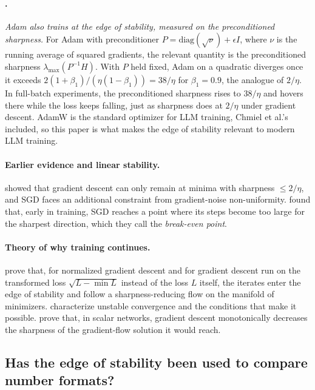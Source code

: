 \documentclass[11pt,letterpaper]{article}
\begin{document}
\paragraph{\citet{Cohen2022}.}
\emph{Adam also trains at the edge of stability, measured on the preconditioned sharpness.} For Adam with preconditioner $P=\mathrm{diag}(\sqrt{\nu})+\epsilon I$, where $\nu$ is the running average of squared gradients, the relevant quantity is the preconditioned sharpness $\lambda_{\max}(P^{-1}H)$. With $P$ held fixed, Adam on a quadratic diverges once it exceeds $2(1+\beta_1)/(\eta(1-\beta_1))=38/\eta$ for $\beta_1=0.9$, the analogue of $2/\eta$. In full-batch experiments, the preconditioned sharpness rises to $38/\eta$ and hovers there while the loss keeps falling, just as sharpness does at $2/\eta$ under gradient descent. AdamW is the standard optimizer for LLM training, Chmiel et al.'s included, so this paper is what makes the edge of stability relevant to modern LLM training.

\paragraph{Earlier evidence and linear stability.}
\citet{Wu2018} showed that gradient descent can only remain at minima with sharpness $\le2/\eta$, and SGD faces an additional constraint from gradient-noise non-uniformity. \citet{Jastrzebski2020} found that, early in training, SGD reaches a point where its steps become too large for the sharpest direction, which they call the \emph{break-even point}.

\paragraph{Theory of why training continues.}
\citet{Arora2022} prove that, for normalized gradient descent and for gradient descent run on the transformed loss $\sqrt{L-\min L}$ instead of the loss $L$ itself, the iterates enter the edge of stability and follow a sharpness-reducing flow on the manifold of minimizers. \citet{Ahn2022} characterize unstable convergence and the conditions that make it possible. \citet{Kreisler2023} prove that, in scalar networks, gradient descent monotonically decreases the sharpness of the gradient-flow solution it would reach.

\subsection{Has the edge of stability been used to compare number formats?}
\end{document}
